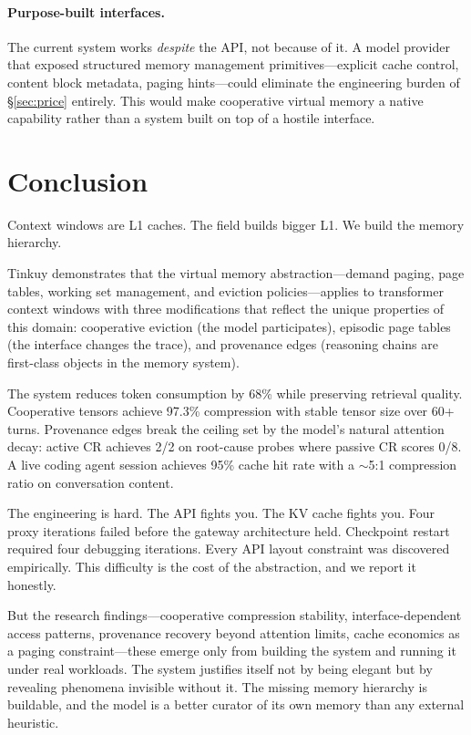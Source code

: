 \documentclass[sigplan,screen,anonymous]{acmart}
\begin{document}
\paragraph{Purpose-built interfaces.}
The current system works \emph{despite} the API, not because of it.
A model provider that exposed structured memory management
primitives---explicit cache control, content block metadata, paging
hints---could eliminate the engineering burden of \S\ref{sec:price}
entirely. This would make cooperative virtual memory a native
capability rather than a system built on top of a hostile interface.


\section{Conclusion}

Context windows are L1 caches. The field builds bigger L1. We build
the memory hierarchy.

Tinkuy demonstrates that the virtual memory abstraction---demand
paging, page tables, working set management, and eviction
policies---applies to transformer context windows with three
modifications that reflect the unique properties of this domain:
cooperative eviction (the model participates), episodic page tables
(the interface changes the trace), and provenance edges (reasoning
chains are first-class objects in the memory system).

The system reduces token consumption by 68\% while preserving
retrieval quality. Cooperative tensors achieve 97.3\% compression
with stable tensor size over 60+ turns. Provenance edges break
the ceiling set by the model's natural attention decay: active CR
achieves 2/2 on root-cause probes where passive CR scores 0/8. A
live coding agent session achieves 95\% cache hit rate with a
$\sim$5:1 compression ratio on conversation content.

The engineering is hard. The API fights you. The KV cache fights you.
Four proxy iterations failed before the gateway architecture held.
Checkpoint restart required four debugging iterations. Every API
layout constraint was discovered empirically. This difficulty is the
cost of the abstraction, and we report it honestly.

But the research findings---cooperative compression stability,
interface-dependent access patterns, provenance recovery beyond
attention limits, cache economics as a paging constraint---these
emerge only from building the system and running it under real
workloads. The system justifies itself not by being elegant but by
revealing phenomena invisible without it. The missing memory hierarchy
is buildable, and the model is a better curator of its own memory than
any external heuristic.



\end{document}
